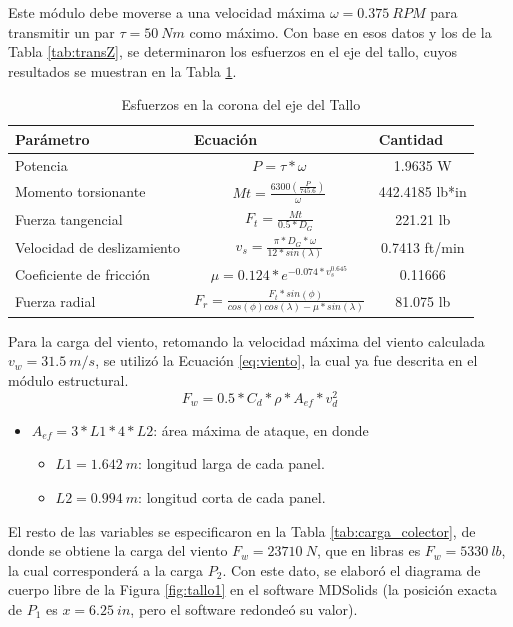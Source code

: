 Este módulo debe moverse a una velocidad máxima $ \omega = 0.375\ RPM $ para transmitir un par $ \tau = 50\ Nm $ como máximo. Con base en esos datos y los de la Tabla \ref{tab:transZ}, se determinaron los esfuerzos en el eje del tallo, cuyos resultados se muestran en la Tabla \ref{tab:Feje}.
\begin{table}[H]
	\centering
	\caption{Esfuerzos en la corona del eje del Tallo}
	\begin{tabular}{|l|c|c|}
		\hline
		\textbf{Parámetro} & \multicolumn{1}{l|}{\textbf{Ecuación}} & \multicolumn{1}{l|}{\textbf{Cantidad}} \\
		\hline \hline
		Potencia & $ P = \tau * \omega $ & 1.9635 W \\
		\hline
		Momento torsionante & $ Mt = \frac{6300(\frac{P}{745.6})}{\omega} $ & 442.4185 lb*in \\
		\hline
		Fuerza tangencial & $ F_t = \frac{Mt}{0.5*D_G} $ & 221.21 lb \\
		\hline
		Velocidad de deslizamiento & $ v_s = \frac{\pi * D_G * \omega}{12*sin(\lambda)} $ & 0.7413 ft/min \\
		\hline
		Coeficiente de fricción & $ \mu = 0.124 * e^{-0.074*v_s^{0.645}} $ & 0.11666 \\
		\hline
		Fuerza radial & $ F_r = \frac{F_t * sin(\phi)}{cos(\phi)cos(\lambda) - \mu * sin(\lambda)} $ & 81.075 lb \\
		\hline
	\end{tabular}%
	\label{tab:Feje}%
\end{table}%

Para la carga del viento, retomando la velocidad máxima del viento calculada $ v_w = 31.5\ m/s $, se utilizó la Ecuación \ref{eq:viento}, la cual ya fue descrita en el módulo estructural.
\begin{equation} \label{eq:viento}
    F_w = 0.5*C_d*\rho*A_{ef}*v_d^2
\end{equation}
\begin{itemize}
	\item $ A_{ef} = 3*L1*4*L2 $: área máxima de ataque, en donde
	\begin{itemize}
		\item $ L1 = 1.642\ m $: longitud larga de cada panel.
		\item $ L2 = 0.994\ m $: longitud corta de cada panel.
	\end{itemize}
\end{itemize}

El resto de las variables se especificaron en la Tabla \ref{tab:carga_colector}, de donde se obtiene la carga del viento $ F_w = 23710\ N $, que en libras es $ F_w = 5330\ lb $, la cual corresponderá a la carga $ P_2 $. Con este dato, se elaboró el diagrama de cuerpo libre de la Figura \ref{fig:tallo1} en el software MDSolids (la posición exacta de $P_1$ es $x=6.25\ in$, pero el software redondeó su valor).

